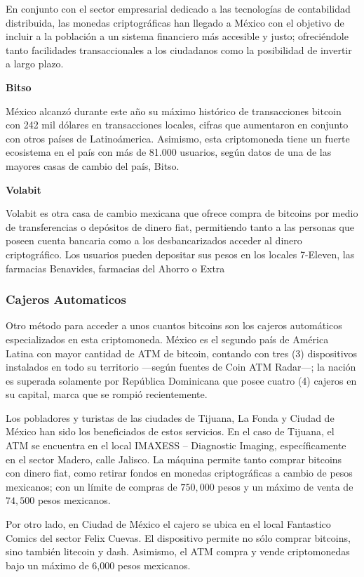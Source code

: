 \documentclass[12pt,letterpaper]{article}
\begin{document}
En conjunto con el sector empresarial dedicado a las tecnolog\'ias de contabilidad distribuida, las monedas criptogr\'aficas han llegado a M\'exico con el objetivo de incluir a la poblaci\'on a un sistema financiero m\'as accesible y justo; ofreci\'endole tanto facilidades transaccionales a los ciudadanos como la posibilidad de invertir a largo plazo.

\textbf{Bitso}

M\'exico alcanz\'o durante este año su m\'aximo hist\'orico de transacciones bitcoin con 242 mil d\'olares en transacciones locales, cifras que aumentaron en conjunto con otros pa\'ises de Latino\'america. Asimismo, esta criptomoneda tiene un fuerte ecosistema en el pa\'is con m\'as de 81.000 usuarios, seg\'un datos de una de las mayores casas de cambio del pa\'is, Bitso.

\textbf{Volabit}

Volabit es otra casa de cambio mexicana que ofrece compra de bitcoins por medio de transferencias o dep\'ositos de dinero fiat, permitiendo tanto a las personas que poseen cuenta bancaria como a los desbancarizados acceder al dinero criptogr\'afico. Los usuarios pueden depositar sus pesos en los locales 7-Eleven, las farmacias Benavides, farmacias del Ahorro o Extra
\subsubsection*{Cajeros Automaticos}
Otro m\'etodo para acceder a unos cuantos bitcoins son los cajeros autom\'aticos especializados en esta criptomoneda. M\'exico es el segundo pa\'is de Am\'erica Latina con mayor cantidad de ATM de bitcoin, contando con tres (3) dispositivos instalados en todo su territorio —seg\'un fuentes de Coin ATM Radar—; la naci\'on es superada solamente por Rep\'ublica Dominicana que posee cuatro (4) cajeros en su capital, marca que se rompi\'o recientemente.

Los pobladores y turistas de las ciudades de Tijuana, La Fonda y Ciudad de M\'exico han sido los beneficiados de estos servicios. En el caso de Tijuana, el ATM se encuentra en el local IMAXESS – Diagnostic Imaging, espec\'ificamente en el sector Madero, calle Jalisco. La m\'aquina permite tanto comprar bitcoins con dinero fiat, como retirar fondos en monedas criptogr\'aficas a cambio de pesos mexicanos; con un l\'imite de compras de $750,000$ pesos y un m\'aximo de venta de $74,500$ pesos mexicanos.

Por otro lado, en Ciudad de M\'exico el cajero se ubica en el local Fantastico Comics del sector Felix Cuevas. El dispositivo permite no s\'olo comprar bitcoins, sino tambi\'en litecoin y dash. Asimismo, el ATM compra y vende criptomonedas bajo un m\'aximo de 6,000 pesos mexicanos.
\end{document}
